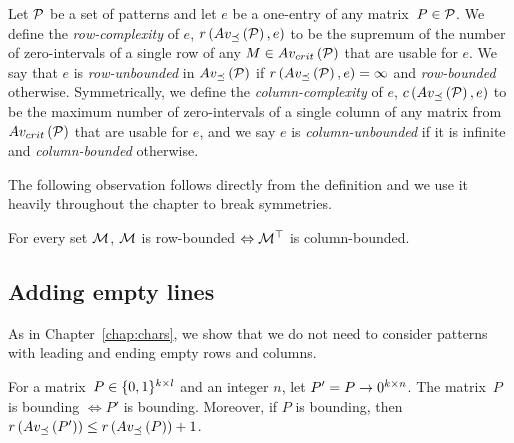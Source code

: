 \begin{defn}
Let $\mathcal{P}$ be a set of patterns and let $e$ be a one-entry of any matrix~$P\in\mathcal{P}$. We define the \emph{row-complexity} of $e$, $r\left(Av_{\preceq}\left(\mathcal{P}\right),e\right)$ to be the supremum of the number of zero-intervals of a single row of any $M\in Av_{crit}\left(\mathcal{P}\right)$ that are usable for $e$. We say that $e$ is \emph{row-unbounded} in $Av_{\preceq}\left(\mathcal{P}\right)$ if $r\left(Av_{\preceq}\left(\mathcal{P}\right),e\right)=\infty$ and \emph{row-bounded} otherwise. Symmetrically, we define the \emph{column-complexity} of $e$, $c\left(Av_{\preceq}\left(\mathcal{P}\right),e\right)$ to be the maximum number of zero-intervals of a single column of any matrix from $Av_{crit}\left(\mathcal{P}\right)$ that are usable for $e$, and  we say $e$ is \emph{column-unbounded} if it is infinite and \emph{column-bounded} otherwise.
\end{defn}

The following observation follows directly from the definition and we use it heavily throughout the chapter to break symmetries.

\begin{obs}
\label{obs:transposebounded}
For every set $\mathcal{M}$, $\mathcal{M}$ is row-bounded $\Leftrightarrow\mathcal{M}^\top$ is column-bounded.
\end{obs}

\subsection{Adding empty lines}
As in Chapter~\ref{chap:chars}, we show that we do not need to consider patterns with leading and ending empty rows and columns.

\begin{obs}
For a matrix~$P\in\{0,1\}^{k\times l}$ and an integer $n$, let $P'=P\rightarrow0^{k\times n}$. The matrix~$P$ is bounding $\Leftrightarrow P'$ is bounding. Moreover, if $P$ is bounding, then $r\left(Av_{\preceq}\left(P'\right)\right)\leq r\left(Av_{\preceq}\left(P\right)\right)+1$.
\end{obs}

